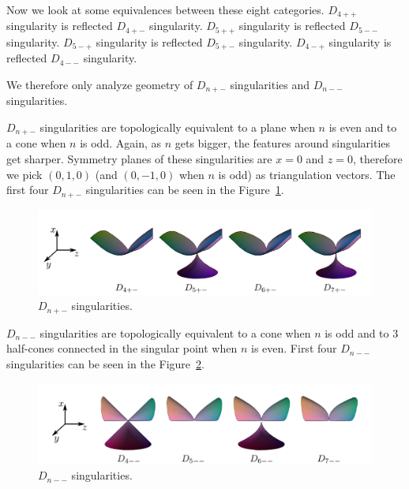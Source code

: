 Now we look at some equivalences between these eight categories.
$D_{4++}$ singularity is reflected $D_{4+-}$ singularity.
$D_{5++}$ singularity is reflected $D_{5--}$ singularity.
$D_{5-+}$ singularity is reflected $D_{5+-}$ singularity.
$D_{4-+}$ singularity is reflected $D_{4--}$ singularity.

We therefore only analyze geometry of $D_{n+-}$ singularities and
$D_{n--}$ singularities.

$D_{n+-}$ singularities are topologically equivalent to a plane when $n$ is
even and to a cone when $n$ is odd. Again, as $n$ gets bigger, the features
around singularities get sharper. Symmetry planes of these singularities
are $x=0$ and $z=0$, therefore we pick $(0, 1, 0)$ (and $(0, -1, 0)$ when $n$ is odd)
as triangulation vectors. The first four $D_{n+-}$ singularities can be seen in
the Figure~\ref{img:7}.

\begin{figure}
    \centerline{\includegraphics[scale=0.5]{images/img7}}
    \caption[$D_{n+-}$ singularities TODO the coordinates are wrong!!]
    {$D_{n+-}$ singularities. \cite{morris2003client}}
    \label{img:7}
\end{figure}


$D_{n--}$ singularities are topologically equivalent to a cone when $n$ is
odd and to 3 half-cones connected in the singular point when $n$ is even.
First four $D_{n--}$ singularities can be seen in the Figure~\ref{img:8}.

\begin{figure}
    \centerline{\includegraphics[scale=0.5]{images/img8}}
    \caption[$D_{n--}$ singularities TODO the coordinates are wrong!!]
    {$D_{n--}$ singularities. \cite{morris2003client}}
    \label{img:8}
\end{figure}

